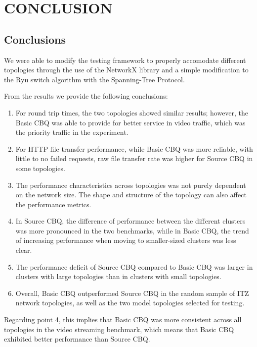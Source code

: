 \chapter{CONCLUSION}
\section{Conclusions}
We were able to modify the testing framework to properly accomodate different topologies through the use of the NetworkX library and a simple modification to the Ryu switch algorithm with the Spanning-Tree Protocol.

From the results we provide the following conclusions:
\begin{enumerate}
    \item For round trip times, the two topologies showed similar results; however, the Basic CBQ was able to provide for better service in video traffic, which was the priority traffic in the experiment.
    \item For HTTP file transfer performance, while Basic CBQ was more reliable, with little to no failed requests, raw file transfer rate was higher for Source CBQ in some topologies. 
    \item The performance characteristics across topologies was not purely dependent on the network size. The shape and structure of the topology can also affect the performance metrics.
    \item In Source CBQ, the difference of performance between the different clusters was more pronounced in the two benchmarks, while in Basic CBQ, the trend of increasing performance when moving to smaller-sized clusters was less clear.
    \item The performance deficit of Source CBQ compared to Basic CBQ was larger in clusters with large topologies than in clusters with small topologies.
    \item Overall, Basic CBQ outperformed Source CBQ in the random sample of ITZ network topologies, as well as the two model topologies selected for testing. 
\end{enumerate}
Regarding point 4, this implies that Basic CBQ was more consistent across all topologies in the video streaming benchmark, which means that Basic CBQ exhibited better performance than Source CBQ.

